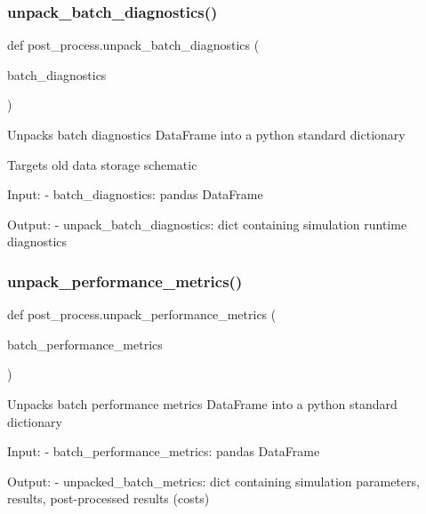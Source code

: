 \subsubsection{\texorpdfstring{unpack\_batch\_diagnostics()}{unpack\_batch\_diagnostics()}}
{\footnotesize\ttfamily def post\+\_\+process.\+unpack\+\_\+batch\+\_\+diagnostics (\begin{DoxyParamCaption}\item[{}]{batch\+\_\+diagnostics }\end{DoxyParamCaption})}

\begin{DoxyVerb}Unpacks batch diagnostics DataFrame into a python standard dictionary

Targets old data storage schematic

Input:
- batch_diagnostics:                    pandas DataFrame

Output:
- unpack_batch_diagnostics:             dict containing simulation runtime diagnostics\end{DoxyVerb}
 \mbox{\label{namespacepost__process_ac12d2839c57449ae1f8c071818ed5755}} 
\subsubsection{\texorpdfstring{unpack\_performance\_metrics()}{unpack\_performance\_metrics()}}
{\footnotesize\ttfamily def post\+\_\+process.\+unpack\+\_\+performance\+\_\+metrics (\begin{DoxyParamCaption}\item[{}]{batch\+\_\+performance\+\_\+metrics }\end{DoxyParamCaption})}

\begin{DoxyVerb}Unpacks batch performance metrics DataFrame into a python standard dictionary

Input:
- batch_performance_metrics:           pandas DataFrame

Output:
- unpacked_batch_metrics:              dict containing simulation parameters, results, post-processed results (costs)\end{DoxyVerb}
 \mbox{\label{namespacepost__process_ab8236930ba1c5b6ecb3de8daacd16a8c}} 
